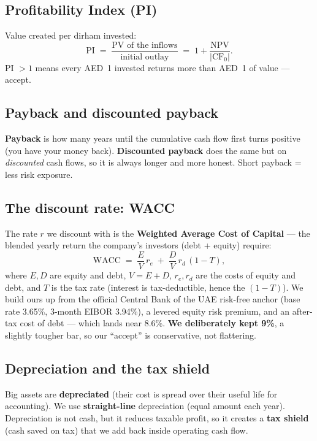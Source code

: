 \documentclass[11pt,a4paper]{article}
\newcommand{\term}[1]{\textcolor{tvblue}{\textbf{#1}}}
\begin{document}
\subsection{Profitability Index (PI)}
Value created per dirham invested:
\[
  \text{PI} \;=\; \frac{\text{PV of the inflows}}{\text{initial outlay}}
  \;=\; 1 + \frac{\text{NPV}}{\lvert \text{CF}_0 \rvert}.
\]
PI $>1$ means every AED~1 invested returns more than AED~1 of value --- accept.

\subsection{Payback and discounted payback}
\term{Payback} is how many years until the cumulative cash flow first turns positive (you have your
money back). \term{Discounted payback} does the same but on \emph{discounted} cash flows, so it is
always longer and more honest. Short payback = less risk exposure.

\subsection{The discount rate: WACC}
The rate $r$ we discount with is the \term{Weighted Average Cost of Capital} --- the blended yearly
return the company's investors (debt + equity) require:
\[
  \text{WACC} \;=\; \frac{E}{V}\,r_e \;+\; \frac{D}{V}\,r_d\,(1-T),
\]
where $E,D$ are equity and debt, $V=E+D$, $r_e,r_d$ are the costs of equity and debt, and $T$ is the
tax rate (interest is tax-deductible, hence the $(1-T)$). We build ours up from the official Central
Bank of the UAE risk-free anchor (base rate 3.65\%, 3-month EIBOR 3.94\%), a levered equity risk
premium, and an after-tax cost of debt --- which lands near 8.6\%. \textbf{We deliberately kept 9\%},
a slightly tougher bar, so our ``accept'' is conservative, not flattering.

\subsection{Depreciation and the tax shield}
Big assets are \term{depreciated} (their cost is spread over their useful life for accounting). We
use \term{straight-line} depreciation (equal amount each year). Depreciation is not cash, but it
reduces taxable profit, so it creates a \term{tax shield} (cash saved on tax) that we add back inside
operating cash flow.
\end{document}
